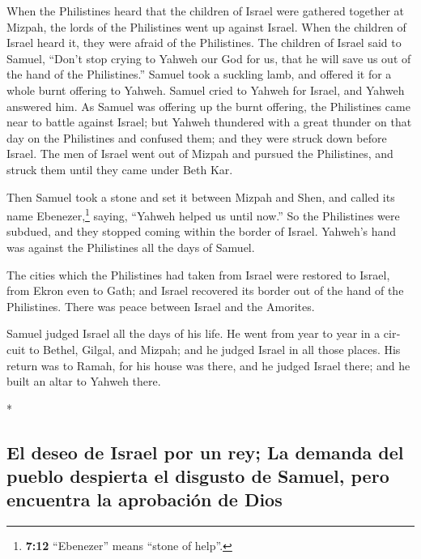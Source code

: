 \begin{paracol}{2}
\begin{otherlanguage}{english}
 When the Philistines heard that the children of Israel
were gathered together at Mizpah, the lords of the Philistines went up
against Israel. When the children of Israel heard it, they were afraid
of the Philistines.  The children of Israel said to
Samuel, ``Don't stop crying to Yahweh our God for us, that he will save
us out of the hand of the Philistines.''  Samuel took a
suckling lamb, and offered it for a whole burnt offering to Yahweh.
Samuel cried to Yahweh for Israel, and Yahweh answered him.
 As Samuel was offering up the burnt offering, the
Philistines came near to battle against Israel; but Yahweh thundered
with a great thunder on that day on the Philistines and confused them;
and they were struck down before Israel.  The men of
Israel went out of Mizpah and pursued the Philistines, and struck them
until they came under Beth Kar.

 Then Samuel took a stone and set it between Mizpah and
Shen, and called its name Ebenezer,\footnote{\textbf{7:12} ``Ebenezer''
  means ``stone of help''.} saying, ``Yahweh helped us until now.''
 So the Philistines were subdued, and they stopped coming
within the border of Israel. Yahweh's hand was against the Philistines
all the days of Samuel.

 The cities which the Philistines had taken from Israel
were restored to Israel, from Ekron even to Gath; and Israel recovered
its border out of the hand of the Philistines. There was peace between
Israel and the Amorites.

 Samuel judged Israel all the days of his life.
 He went from year to year in a circuit to Bethel,
Gilgal, and Mizpah; and he judged Israel in all those places.
 His return was to Ramah, for his house was there, and he
judged Israel there; and he built an altar to Yahweh there.

\end{otherlanguage}

\switchcolumn[0]*

\hypertarget{el-deseo-de-israel-por-un-rey-la-demanda-del-pueblo-despierta-el-disgusto-de-samuel-pero-encuentra-la-aprobaciuxf3n-de-dios}{%
\subsection{El deseo de Israel por un rey; La demanda del pueblo
despierta el disgusto de Samuel, pero encuentra la aprobación de
Dios}\label{el-deseo-de-israel-por-un-rey-la-demanda-del-pueblo-despierta-el-disgusto-de-samuel-pero-encuentra-la-aprobaciuxf3n-de-dios}}


\end{paracol}
